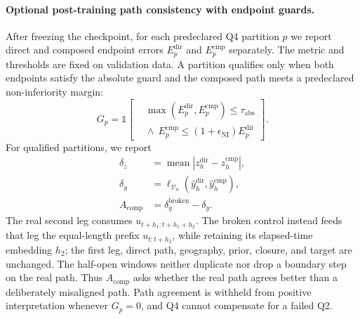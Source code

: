 \documentclass[letterpaper]{article} %
\begin{document}
\paragraph{Optional post-training path consistency with endpoint guards.}
After freezing the checkpoint, for each predeclared Q4 partition $p$ we report
direct and composed endpoint errors
$E_p^{\mathrm{dir}}$ and $E_p^{\mathrm{cmp}}$ separately. The metric and
thresholds are fixed on validation data. A partition qualifies only when both
endpoints satisfy the absolute guard and the composed path meets a
predeclared non-inferiority margin:
\begin{equation}
G_p=\mathbb 1\!\left[
\begin{aligned}
&\max(E_p^{\mathrm{dir}},E_p^{\mathrm{cmp}})
\leq\tau_{\mathrm{abs}}\\[-1mm]
&{}\wedge\
E_p^{\mathrm{cmp}}\leq(1+\epsilon_{\mathrm{NI}})E_p^{\mathrm{dir}}
\end{aligned}
\right].
\label{eq:endpointguard}
\end{equation}
For qualified partitions, we report
\begin{equation}
\begin{aligned}
\delta_z&=\operatorname{mean}|z_h^{\mathrm{dir}}-z_h^{\mathrm{cmp}}|,\\
\delta_y&=\ell_{\mathcal V_h}
(\widehat y_h^{\mathrm{dir}},\widehat y_h^{\mathrm{cmp}}),\\
A_{\mathrm{comp}}&=\delta_y^{\mathrm{broken}}-\delta_y .
\end{aligned}
\label{eq:pathmetric}
\end{equation}
The real second leg consumes $u_{t+h_1:t+h_1+h_2}$. The broken control instead
feeds that leg the equal-length prefix $u_{t:t+h_2}$, while retaining its
elapsed-time embedding $h_2$; the first leg, direct path, geography, prior,
closure, and target are unchanged. The half-open windows neither duplicate nor
drop a boundary step on the real path. Thus
$A_{\mathrm{comp}}$ asks whether the real path agrees better than a deliberately
misaligned path. Path agreement is withheld from positive interpretation
whenever $G_p=0$, and Q4 cannot compensate for a failed Q2.
\end{document}
